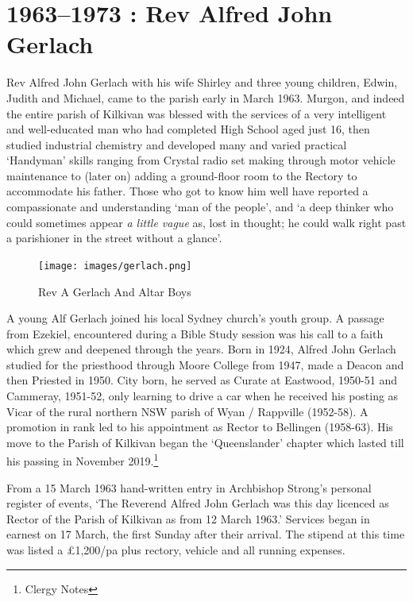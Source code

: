 \printendnotes[custom]
\setcounter{endnote}{0}
\chapter{1963--1973 : Rev Alfred John
Gerlach}

Rev Alfred John Gerlach with his wife Shirley and three young children,
Edwin, Judith and Michael, came to the parish early in March 1963.
Murgon, and indeed the entire parish of Kilkivan was blessed with the
services of a very intelligent and well-educated man who had completed
High School aged just 16, then studied industrial chemistry and
developed many and varied practical `Handyman' skills ranging from
Crystal radio set making through motor vehicle maintenance to (later on)
adding a ground-floor room to the Rectory to accommodate his father.
Those who got to know him well have reported a compassionate and
understanding `man of the people', and `a deep thinker who could
sometimes appear \emph{a little vague} as, lost in thought; he could
walk right past a parishioner in the street without a glance'.




\begin{figure}[!h]
\begin{center}
\texttt{[image: images/gerlach.png]}
\caption{Rev A Gerlach And Altar Boys}
\end{center}
\end{figure}


A young Alf Gerlach joined his local Sydney church's youth group. A
passage from Ezekiel, encountered during a Bible Study session was his
call to a faith which grew and deepened through the years. Born in 1924,
Alfred John Gerlach studied for the priesthood through Moore College
from 1947, made a Deacon and then Priested in 1950. City born, he served
as Curate at Eastwood, 1950-51 and Cammeray, 1951-52, only learning to
drive a car when he received his posting as Vicar of the rural northern
NSW parish of Wyan / Rappville (1952-58). A promotion in rank led to his
appointment as Rector to Bellingen (1958-63). His move to the Parish of
Kilkivan began the `Queenslander' chapter which lasted till his passing
in November 2019.\footnote{Clergy Notes}

From a 15 March 1963 hand-written entry in Archbishop Strong's personal
register of events, `The Reverend Alfred John Gerlach was this day
licenced as Rector of the Parish of Kilkivan as from 12 March 1963.'
Services began in earnest on 17 March, the first Sunday after their
arrival. The stipend at this time was listed a \pounds1,200/pa plus rectory,
vehicle and all running expenses.

